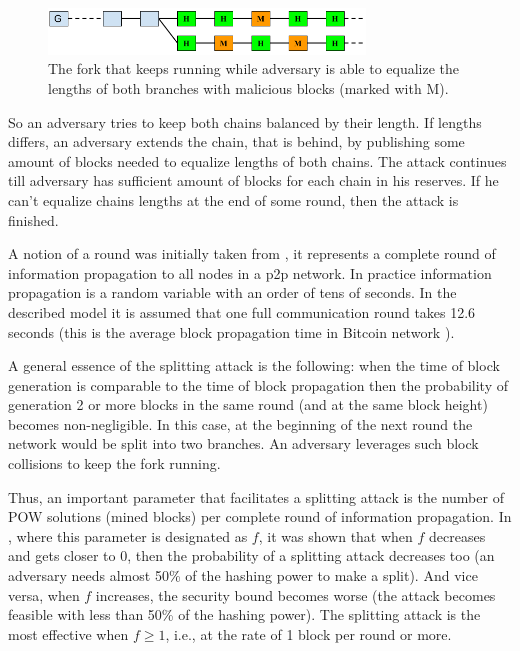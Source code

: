 \documentclass[10pt,a4paper]{article}
\numberwithin{equation}{section} %
\theoremstyle{plain}
\theoremstyle{definition}
\theoremstyle{remark}
\begin{document}
	\begin{figure}[h]
            \centering
            \includegraphics[width=0.75\textwidth]{split}
            \caption{The fork that keeps running while adversary is able to equalize the lengths of both branches with malicious blocks (marked with M).}
            \label{fig:split}
    \end{figure}
	
	So an adversary tries to keep both chains balanced by their length. If lengths differs, an adversary extends the chain, that is behind, by publishing some amount of blocks needed to equalize lengths of both chains. The attack continues till adversary has sufficient amount of blocks for each chain in his reserves. If he can't equalize chains lengths at the end of some round, then the attack is finished.
	
	A notion of a round was initially taken from \cite{GKL15}, it represents a complete round of information propagation to all nodes in a p2p network. In practice information propagation is a random variable with an order of tens of seconds. In the described model it is assumed that one full communication round takes 12.6 seconds (this is the average block propagation time in Bitcoin network \cite{DW13}).
	
	A general essence of the splitting attack is the following: when the time of block generation is comparable to the time of block propagation then the probability of generation 2 or more blocks in the same round (and at the same block height) becomes non-negligible. In this case, at the beginning of the next round the network would be split into two branches. An adversary leverages such block collisions to keep the fork running.
	
	Thus, an important parameter that facilitates a splitting attack is the number of POW solutions (mined blocks) per complete round of information propagation. In \cite{KP15}, where this parameter is designated as \(f\), it was shown that when \(f\) decreases and gets closer to 0, then the probability of a splitting attack decreases too (an adversary needs almost 50\% of the hashing power to make a split). And vice versa, when \(f\) increases, the security bound becomes worse (the attack becomes feasible with less than 50\% of the hashing power). The splitting attack is the most effective when \(f \geq 1 \), i.e., at the rate of 1 block per round or more.
\end{document}
